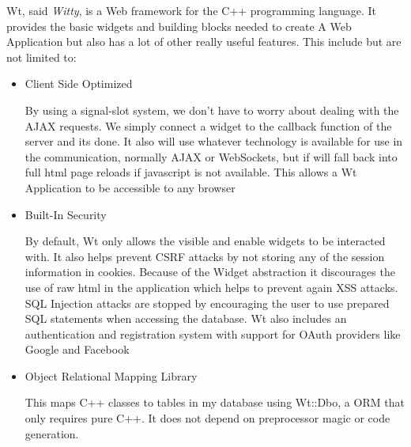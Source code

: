 Wt, said \textit{Witty}, is a Web framework for the C++ programming language. It provides the basic widgets and building blocks needed to create A Web Application but also has a lot of other really useful features. This include but are not limited to:

\begin{itemize}
\item{Client Side Optimized

By using a signal-slot system, we don't have to worry about dealing with the AJAX requests. We simply connect a widget to the callback function of the server and its done. It also will use whatever technology is available for use in the communication, normally AJAX or WebSockets, but if will fall back into full html page reloads if javascript is not available. This allows a Wt Application to be accessible to any browser}
\item{Built-In Security

By default, Wt only allows the visible and enable widgets to be interacted with. It also helps prevent CSRF attacks by not storing any of the session information in cookies. Because of the Widget abstraction it discourages the use of raw html in the application which helps to prevent again XSS attacks. SQL Injection attacks are stopped by encouraging the user to use prepared SQL statements when accessing the database. Wt also includes an authentication and registration system with support for OAuth providers like Google and Facebook}
\item{Object Relational Mapping Library

This maps C++ classes to tables in my database using Wt::Dbo, a ORM that only requires pure C++. It does not depend on preprocessor magic or code generation.}
\end{itemize}

